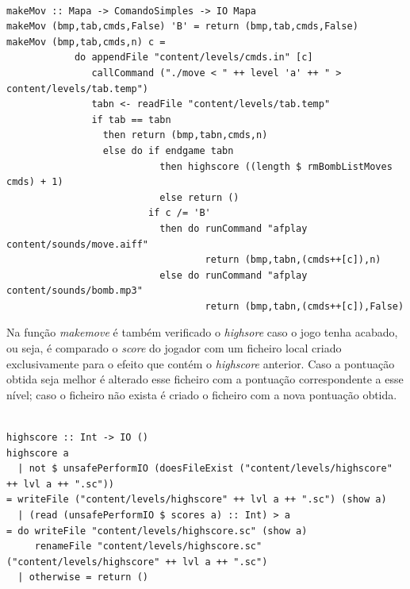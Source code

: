 \documentclass[12pt,a4paper]{report}
\begin{document}
\begin{verbatim}

makeMov :: Mapa -> ComandoSimples -> IO Mapa
makeMov (bmp,tab,cmds,False) 'B' = return (bmp,tab,cmds,False)
makeMov (bmp,tab,cmds,n) c = 
            do appendFile "content/levels/cmds.in" [c]
               callCommand ("./move < " ++ level 'a' ++ " > content/levels/tab.temp")
               tabn <- readFile "content/levels/tab.temp"
               if tab == tabn
                 then return (bmp,tabn,cmds,n) 
                 else do if endgame tabn
                           then highscore ((length $ rmBombListMoves cmds) + 1)
                           else return ()
                         if c /= 'B' 
                           then do runCommand "afplay content/sounds/move.aiff"
                                   return (bmp,tabn,(cmds++[c]),n) 
                           else do runCommand "afplay content/sounds/bomb.mp3"
                                   return (bmp,tabn,(cmds++[c]),False) 

\end{verbatim}

\hfill

\hfill

Na função \emph{makemove} é também verificado o \emph{highsore} caso o jogo tenha acabado, ou seja, é comparado o \emph{score} do jogador com um ficheiro local criado exclusivamente para o efeito que contém o \emph{highscore} anterior. Caso a pontuação obtida seja melhor é alterado esse ficheiro com a pontuação correspondente a esse nível; caso o ficheiro não exista é criado o ficheiro com a nova pontuação obtida.\\

\begin{verbatim}

highscore :: Int -> IO ()
highscore a
  | not $ unsafePerformIO (doesFileExist ("content/levels/highscore" ++ lvl a ++ ".sc")) 
= writeFile ("content/levels/highscore" ++ lvl a ++ ".sc") (show a)
  | (read (unsafePerformIO $ scores a) :: Int) > a                                 
= do writeFile "content/levels/highscore.sc" (show a)
     renameFile "content/levels/highscore.sc" ("content/levels/highscore" ++ lvl a ++ ".sc")
  | otherwise = return ()


\end{verbatim}
\end{document}
